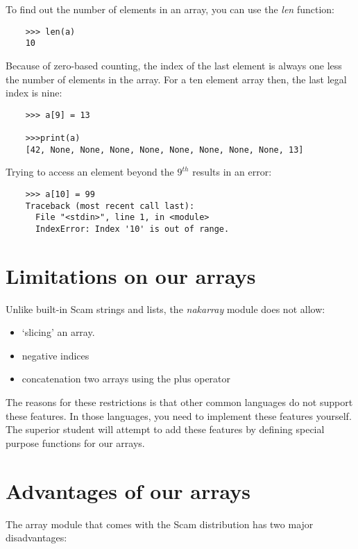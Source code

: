 To find out the number of elements in an array, you can use
the {\it len} function:

\begin{verbatim}
    >>> len(a)
    10
\end{verbatim}

Because of zero-based counting, the index of the last element
is always one less the number of elements in the array. For
a ten element array then, the last legal index is nine:

\begin{verbatim}
    >>> a[9] = 13

    >>>print(a)
    [42, None, None, None, None, None, None, None, None, 13]
\end{verbatim}

Trying to access an element beyond the $9^{th}$ results in
an error:

\begin{verbatim}
    >>> a[10] = 99
    Traceback (most recent call last):
      File "<stdin>", line 1, in <module>
      IndexError: Index '10' is out of range.
\end{verbatim}

\section{Limitations on our arrays}

Unlike built-in Scam strings and lists, the {\it nakarray} module
does not allow:

\begin{itemize}
\item
        `slicing' an array.
\item
        negative indices
\item
        concatenation two arrays using the plus operator
\end{itemize}

The reasons for these restrictions is that other common languages
do not support these features. In those languages, you need
to implement these features yourself. The superior student
will attempt to add these features by defining special purpose
functions for our arrays.

\section{Advantages of our arrays}

The array module that comes with the
Scam distribution has two major disadvantages:


